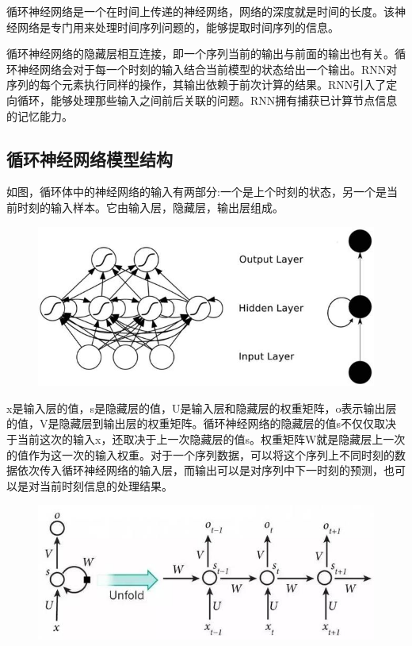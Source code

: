 \documentclass[openbib]{article}
\begin{document}
循环神经网络是一个在时间上传递的神经网络，网络的深度就是时间的长度。该神经网络是专门用来处理时间序列问题的，能够提取时间序列的信息。

循环神经网络的隐藏层相互连接，即一个序列当前的输出与前面的输出也有关。循环神经网络会对于每一个时刻的输入结合当前模型的状态给出一个输出。RNN对序列的每个元素执行同样的操作，其输出依赖于前次计算的结果。RNN引入了定向循环，能够处理那些输入之间前后关联的问题。RNN拥有捕获已计算节点信息的记忆能力。

\subsection{循环神经网络模型结构}
如图，循环体中的神经网络的输入有两部分:一个是上个时刻的状态，另一个是当前时刻的输入样本。它由输入层，隐藏层，输出层组成。
\begin{figure}[htbp]
	\centering
	\includegraphics[scale=0.5]{循环神经网络结构模型.jpg}
\end{figure}

x是输入层的值，s是隐藏层的值，U是输入层和隐藏层的权重矩阵，o表示输出层的值，V是隐藏层到输出层的权重矩阵。循环神经网络的隐藏层的值s不仅仅取决于当前这次的输入x，还取决于上一次隐藏层的值s。权重矩阵W就是隐藏层上一次的值作为这一次的输入权重。对于一个序列数据，可以将这个序列上不同时刻的数据依次传入循环神经网络的输入层，而输出可以是对序列中下一时刻的预测，也可以是对当前时刻信息的处理结果。
\begin{figure}[htbp]
	\centering
	\includegraphics[scale=0.5]{循环神经网络展开图.jpg}
\end{figure}
\end{document}
